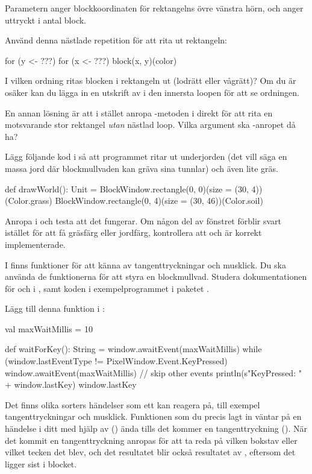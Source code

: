 Parametern  anger blockkoordinaten för rektangelns övre vänstra hörn, och  anger  uttryckt i antal block.

Använd denna nästlade repetition för att rita ut rektangeln:

\begin{Code}
for (y <- ???) {
	for (x <- ???) {
		block(x, y)(color)
	}
}
\end{Code}

\Subtask\Pen
I vilken ordning ritas blocken i rektangeln ut (lodrätt eller vågrätt)? Om du är osäker kan du lägga in en utskrift av  i den innersta loopen för att se ordningen.

\Subtask\Pen En annan lösning är att i stället anropa -metoden i  direkt för att rita en motsvarande stor rektangel \emph{utan} nästlad loop. Vilka argument ska -anropet då ha?

\Subtask Lägg följande kod i  så att programmet ritar ut underjorden (det vill säga en massa jord där blockmullvaden kan gräva sina tunnlar) och även lite gräs.

\begin{Code}
def drawWorld(): Unit = {
  BlockWindow.rectangle(0, 0)(size = (30, 4))(Color.grass)
  BlockWindow.rectangle(0, 4)(size = (30, 46))(Color.soil)
}
\end{Code}

\Subtask Anropa  i  och testa att det fungerar. Om någon del av fönstret förblir svart istället för att få gräsfärg eller jordfärg, kontrollera att  och  är korrekt implementerade.

\Task
I  finns funktioner för att känna av tangenttryckningar och mus\-klick.
Du ska använda de funktionerna för att styra en blockmullvad. Studera dokumentationen för  och  i , samt koden i exempelprogrammet  i paketet .

\Subtask
Lägg till denna funktion i :
\begin{Code}
  val maxWaitMillis = 10

  def waitForKey(): String = {
    window.awaitEvent(maxWaitMillis)
    while (window.lastEventType != PixelWindow.Event.KeyPressed) {
      window.awaitEvent(maxWaitMillis) // skip other events
    }
    println(s"KeyPressed: " + window.lastKey)
    window.lastKey
  }
\end{Code}
\noindent Det finns olika sorters händelser som ett  kan reagera på, till exempel tangenttryckningar och musklick.
Funktionen som du precis lagt in väntar på en händelse i ditt  med hjälp av () ända tills det kommer en tangenttryckning ().
När det kommit en tangenttryckning anropas  för att ta reda på vilken bokstav eller vilket tecken det blev, och det resultatet blir också resultatet av , eftersom det ligger sist i blocket.

